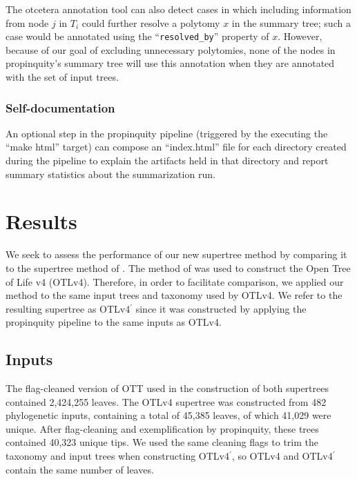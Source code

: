 \documentclass[fleqn,12pt,lineno,english]{wlpeerj}
\newcommand{\otl}{OTLv4}
\newcommand{\otlprop}{OTLv4$^\prime$}
\newcommand{\resolvedby}{\texttt{resolved\_by}}
\begin{document}
The otcetera annotation tool can also detect cases in which including
information from node $j$ in $T_{i}$ could further resolve a polytomy
$x$ in the summary tree; such a case would be annotated using the
``\resolvedby{}'' property of $x$. However, because of our goal
of excluding unnecessary polytomies, none of the nodes in propinquity's
summary tree will use this annotation when they are annotated with
the set of input trees.

\subsubsection{Self-documentation}

An optional step in the propinquity pipeline (triggered by the executing
the ``make html'' target) can compose an ``index.html'' file for
each directory created during the pipeline to explain the artifacts
held in that directory and report summary statistics about the summarization
run.

\section{Results}

We seek to assess the performance of our new supertree method by
comparing it to the supertree method of \cite{HinchliffEtAl2015}.  The
method of \cite{HinchliffEtAl2015} was used to construct the Open Tree
of Life v4 (\otl{}).  Therefore, in order to facilitate comparison, we 
applied our method to the same input trees and taxonomy used by
\otl{}.  
We refer to the resulting supertree as \otlprop{} since it was
constructed by applying the propinquity pipeline to the same inputs as
\otl{}.

\subsection{Inputs}

The flag-cleaned version of OTT used in the construction of both
supertrees contained 2,424,255 leaves.  The
\otl{} supertree was constructed from 482 phylogenetic inputs,
containing a total of 45,385 leaves, of which 41,029 were unique.
After flag-cleaning and exemplification by propinquity, these trees contained 40,323
unique tips. We used the same cleaning flags to trim the taxonomy and
input trees when constructing \otlprop{}, so \otl{} and \otlprop{} contain the
same number of leaves.
\end{document}
